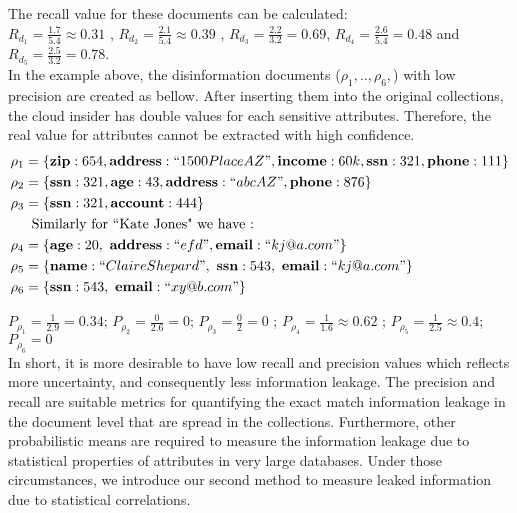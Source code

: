 The recall value for these documents can be calculated:\\ $R_{d_1}=\frac{1.7}{5.4} \approx 0.31$ , $R_{d_2}=\frac{2.1}{5.4} \approx 0.39$ , $R_{d_3}=\frac{2.2}{3.2} = 0.69$, $R_{d_4}=\frac{2.6}{5.4} = 0.48$ and $R_{d_5}=\frac{2.5}{3.2} = 0.78$.\\ 
In the example above, the disinformation documents ($\rho_1,.., \rho_6,$) with low precision are created as bellow. After inserting them into the original collections, the cloud insider has double values for each sensitive attributes. Therefore, the real value for attributes cannot be extracted with high confidence.\\
\begin{align*}
\rho_1&=\{ {\bf zip} : 654, {\bf address} : ``1500 Place AZ", {\bf income} : 60k, {\bf ssn}:321 , {\bf phone} : 111\}\\
\rho_2&=\{ {\bf ssn} : 321, {\bf age} : 43, {\bf address}: ``abc AZ" , {\bf phone} : 876 \}\\
\rho_3&=\{ {\bf ssn} : 321, {\bf account} : 444\}\\
\noalign{Similarly for ``Kate Jones" we have :}
\rho_4&=\{{\bf age} : 20,~ {\bf address}: ``efd",{\bf email}:``kj@a.com"\}\\
\rho_5&=\{ {\bf name} : ``Claire Shepard",~ {\bf ssn} : 543,~{\bf email}:``kj@a.com"\}\\
\rho_6&=\{ {\bf ssn} : 543,~{\bf email}:``xy@b.com"\}\\
\end{align*}

$P_{\rho_1}=\frac{1}{2.9} =	0.34$; $P_{\rho_2}=\frac{0}{2.6}=0$; 
$P_{\rho_3}=\frac{0}{2} = 0$ ; $P_{\rho_4}=\frac{1}{1.6} \approx	0.62$ ; $P_{\rho_5}=\frac{1}{2.5} \approx	0.4$; $P_{\rho_6}=0$ \\

In short, it is more desirable to have low recall and precision values which reflects more uncertainty, and consequently less information leakage. The precision and recall are suitable metrics for quantifying the exact match information leakage in the document level that are spread in the collections. Furthermore, other probabilistic means are required to measure the information leakage due to statistical properties of attributes in very large databases. Under those circumstances, we introduce our second method to measure leaked information due to statistical correlations.

\medskip


